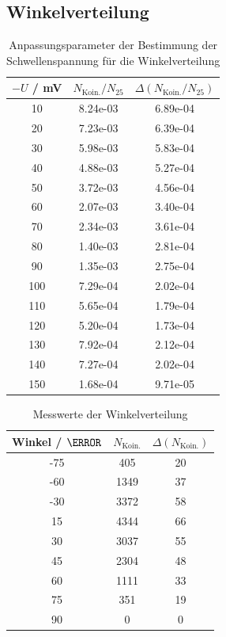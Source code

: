 \documentclass{article}
\begin{document}
\subsection{Winkelverteilung}
\begin{table}[H]
    \centering
    \caption{Anpassungsparameter der Bestimmung der Schwellenspannung für die Winkelverteilung}
    \begin{tabular}{|c|c|c|}
        \hline
        $-U$ / mV & $N_\mathrm{Koin.}/N_{25}$ & $\Delta (N_\mathrm{Koin.}/N_{25})$ \\ \hline \hline
        10 & 8.24e-03 & 6.89e-04 \\ \hline
        20 & 7.23e-03 & 6.39e-04 \\ \hline
        30 & 5.98e-03 & 5.83e-04 \\ \hline
        40 & 4.88e-03 & 5.27e-04 \\ \hline
        50 & 3.72e-03 & 4.56e-04 \\ \hline
        60 & 2.07e-03 & 3.40e-04 \\ \hline
        70 & 2.34e-03 & 3.61e-04 \\ \hline
        80 & 1.40e-03 & 2.81e-04 \\ \hline
        90 & 1.35e-03 & 2.75e-04 \\ \hline
        100 & 7.29e-04 & 2.02e-04 \\ \hline
        110 & 5.65e-04 & 1.79e-04 \\ \hline
        120 & 5.20e-04 & 1.73e-04 \\ \hline
        130 & 7.92e-04 & 2.12e-04 \\ \hline
        140 & 7.27e-04 & 2.02e-04 \\ \hline
        150 & 1.68e-04 & 9.71e-05 \\ \hline
    \end{tabular}   
    \label{tab:SchwellenspannungWinkelverteilung}
\end{table}

\begin{table}[H]
    \centering
    \caption{Messwerte der Winkelverteilung}
    \begin{tabular}{|c|c|c|}
        \hline
        Winkel / $\degree$ & $N_\mathrm{Koin.}$ & $\Delta (N_\mathrm{Koin.})$ \\ \hline \hline
        -75 & 405 & 20 \\ \hline
        -60 & 1349 & 37 \\ \hline
        -30 & 3372 & 58 \\ \hline
        15 & 4344 & 66 \\ \hline
        30 & 3037 & 55 \\ \hline
        45 & 2304 & 48 \\ \hline
        60 & 1111 & 33 \\ \hline
        75 & 351 & 19 \\ \hline
        90 & 0 & 0 \\ \hline
    \end{tabular}
    \label{tab:Winkelverteilung}
\end{table}
\end{document}
